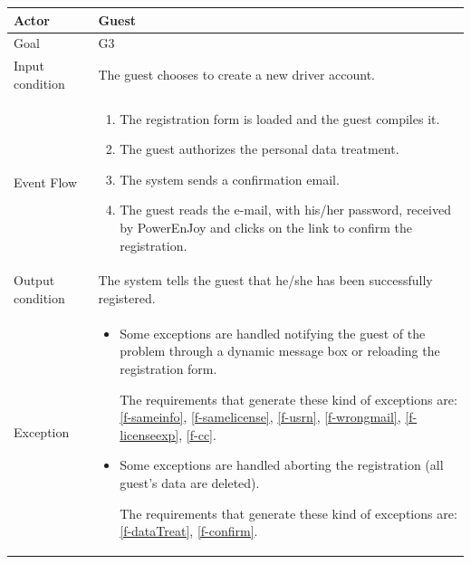 
\begin{table}[H]
\begin{center}
	\begin{tabular}{| l | p{} |}
		\hline
		Actor & Guest \\
		\hline
		Goal & G3
		\\
		\hline
		Input condition & The guest chooses to create a new driver account.  \\
		\hline
		Event Flow & \begin{enumerate}
			\item The registration form is loaded and the guest compiles it.
			\item The guest authorizes the personal data treatment.
			\item The system sends a confirmation email.
			\item The guest reads the e-mail, with his/her password, received by PowerEnJoy and clicks on the link to confirm the registration.
		\end{enumerate}
		\\
		\hline
		Output condition & The system tells the guest that he/she has been successfully registered. \\
		\hline
		
		Exception &  \begin{itemize}
			\item Some exceptions are handled notifying the guest of the problem through a dynamic message box or reloading the registration form.
			
			The requirements that generate these kind of exceptions are:
			\ref{f-sameinfo},   %
			\ref{f-samelicense}, %
			\ref{f-usrn},       %
			\ref{f-wrongmail},  %
			\ref{f-licenseexp}, %
			\ref{f-cc}.			%
			
			\item Some exceptions are handled aborting the registration (all guest's data are deleted).
			
			The requirements that generate these kind of exceptions are:
			\ref{f-dataTreat},   %
			\ref{f-confirm}.   %
		\end{itemize}
		\\
		\hline
	\end{tabular}
\end{center}
\end{table}

